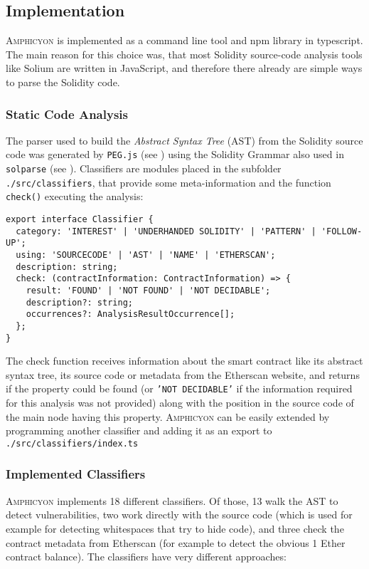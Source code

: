 \subsection{Implementation}
\textsc{Amphicyon} is implemented as a command line tool and npm library in typescript. The main reason for this choice was, that most Solidity source-code analysis tools like Solium are written in JavaScript, and therefore there already are simple ways to parse the Solidity code.

\subsubsection{Static Code Analysis}
The parser used to build the \textit{Abstract Syntax Tree} (AST) from the Solidity source code was generated by \texttt{PEG.js} (see \cite{github:pegjs}) using the Solidity Grammar also used in \texttt{solparse} (see \cite{github:solparse}). Classifiers are modules placed in the subfolder \texttt{./src/classifiers}, that provide some meta-information and the function \texttt{check()} executing the analysis:

\begin{verbatim}
export interface Classifier {
  category: 'INTEREST' | 'UNDERHANDED SOLIDITY' | 'PATTERN' | 'FOLLOW-UP';
  using: 'SOURCECODE' | 'AST' | 'NAME' | 'ETHERSCAN';
  description: string;
  check: (contractInformation: ContractInformation) => {
    result: 'FOUND' | 'NOT FOUND' | 'NOT DECIDABLE';
    description?: string;
    occurrences?: AnalysisResultOccurrence[];
  };
}
\end{verbatim}

The check function receives information about the smart contract like its abstract syntax tree, its source code or metadata from the Etherscan website, and returns if the property could be found (or \texttt{'NOT DECIDABLE'} if the information required for this analysis was not provided) along with the position in the source code of the main node having this property. \textsc{Amphicyon} can be easily extended by programming another classifier and adding it as an export to \texttt{./src/classifiers/index.ts}

\subsubsection{Implemented Classifiers}
\textsc{Amphicyon} implements 18 different classifiers. Of those, 13 walk the AST to detect vulnerabilities, two work directly with the source code (which is used for example for detecting whitespaces that try to hide code), and three check the contract metadata from Etherscan (for example to detect the obvious 1 Ether contract balance). The classifiers have very different approaches:

